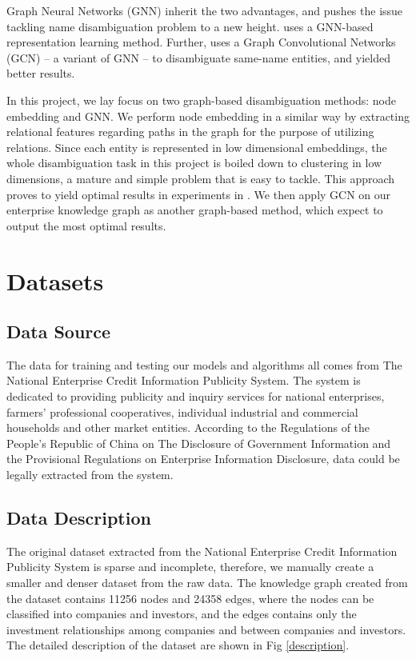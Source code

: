 \documentclass[sigconf, nonacm]{acmart}
\begin{document}
Graph Neural Networks (GNN) inherit the two advantages, and pushes the issue tackling name disambiguation problem to a new height. \cite{gnn1} uses a GNN-based representation learning method. Further, \cite{gnn2} uses a Graph Convolutional Networks (GCN) -- a variant of GNN -- to disambiguate same-name entities, and yielded better results.

In this project, we lay focus on two graph-based disambiguation methods: node embedding and GNN. We perform node embedding in a similar way by extracting relational features regarding paths in the graph for the purpose of utilizing relations. Since each entity is represented in low dimensional embeddings, the whole disambiguation task in this project is boiled down to clustering in low dimensions, a mature and simple problem that is easy to tackle. This approach proves to yield optimal results in experiments in \cite{Schulz_2014}\cite{zhang2017disambiguation}\cite{zhang2016disambiguation}. We then apply GCN on our enterprise knowledge graph as another graph-based method, which expect to output the most optimal results.

\section{Datasets}
\subsection{Data Source}
The data for training and testing our models and algorithms all comes from The National Enterprise Credit Information Publicity System. The system is dedicated to providing publicity and inquiry services for national enterprises, farmers' professional cooperatives, individual industrial and commercial households and other market entities. According to the Regulations of the People's Republic of China on The Disclosure of Government Information and the Provisional Regulations on Enterprise Information Disclosure, data could be legally extracted from the system. 
\subsection{Data Description}
The original dataset extracted from the National Enterprise Credit Information Publicity System is sparse and incomplete, therefore, we manually create a smaller and denser dataset from the raw data. The knowledge graph created from the dataset contains 11256 nodes and 24358 edges, where the nodes can be classified into companies and investors, and the edges contains only the investment relationships among companies and between companies and investors. The detailed description of the dataset are shown in Fig \ref{description}.
\end{document}
